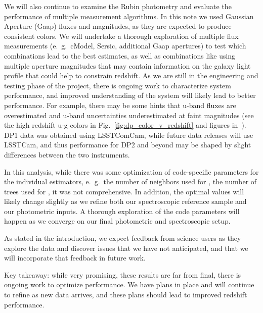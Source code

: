 We will also continue to examine the Rubin photometry and evaluate the performance of multiple measurement algorithms.  In this note we used Gaussian Aperture (Gaap) fluxes and magnitudes, as they are expected to produce consistent colors.  We will undertake a thorough exploration of multiple flux measurements (e.~g.~cModel, Sersic, additional Gaap apertures) to test which combinations lead to the best \photoz estimates, as well as combinations like using multiple aperture magnitudes that may contain information on the galaxy light profile that could help to constrain redshift.  As we are still in the engineering and testing phase of the project, there is ongoing work to characterize system performance, and improved understanding of the system will likely lead to better \photoz performance.  For example, there may be some hints that u-band fluxes are overestimated and u-band uncertainties underestimated at faint magnitudes (see the high redshift u-g colors in Fig.~\ref{fig:dp_color_v_redshift} and figures in~\citet{RTN-095}).  DP1 data was obtained using LSSTComCam, while future data releases will use LSSTCam, and thus performance for DP2 and beyond may be shaped by slight differences between the two instruments.  

In this analysis, while there was some optimization of code-specific parameters for the individual estimators, e.~g.~the number of neighbors used for , the number of trees used for , it was not comprehensive.  In addition, the optimal values will likely change slightly as we refine both our spectroscopic reference sample and our photometric inputs.  A thorough exploration of the code parameters will happen as we converge on our final photometric and spectroscopic setup.

As stated in the introduction, we expect feedback from science users as they explore the data and discover issues that we have not anticipated, and that we will incorporate that feedback in future work.

Key takeaway: while very promising, these results are far from final, there is ongoing work to optimize \photoz performance.  We have plans in place and will continue to refine as new data arrives, and these plans should lead to improved redshift performance. 

\pagebreak




